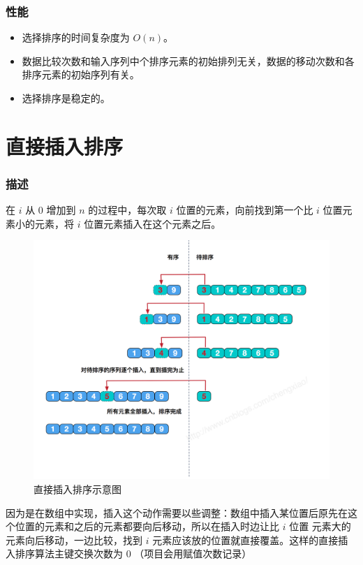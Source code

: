 \subsubsection{性能}
\begin{itemize}
    \item 选择排序的时间复杂度为 $O(n)$。
    \item 数据比较次数和输入序列中个排序元素的初始排列无关，数据的移动次数和各排序元素的初始序列有关。 
    \item 选择排序是稳定的。
\end{itemize}


\section{直接插入排序}

\subsubsection{描述}
在 $i$ 从 $0$ 增加到 $n$ 的过程中，每次取 $i$ 位置的元素，向前找到第一个比 $i$ 位置元素小的元素，将 $i$ 位置元素插入在这个元素之后。

\begin{figure}[H]
    \centering
    \includegraphics[width=13.5cm]{src/insertion.png}
    \caption{直接插入排序示意图}    
\end{figure}

因为是在数组中实现，插入这个动作需要以些调整：数组中插入某位置后原先在这个位置的元素和之后的元素都要向后移动，所以在插入时边让比 $i$ 位置%
元素大的元素向后移动，一边比较，找到  $i$ 元素应该放的位置就直接覆盖。这样的直接插入排序算法主键交换次数为 $0$ （项目会用{\kaishu 赋值次数}记录）

